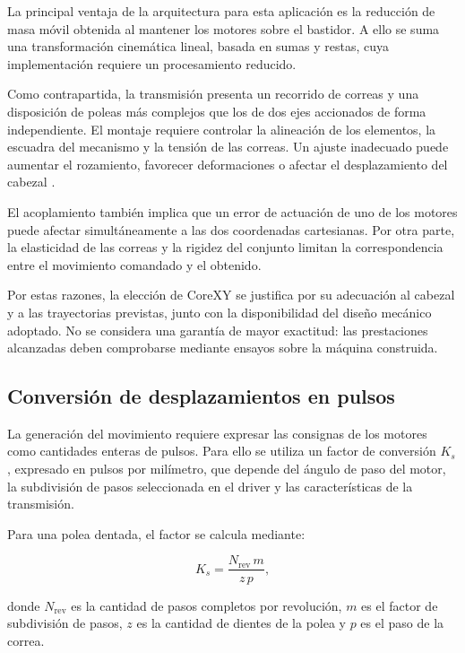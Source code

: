 \documentclass[blue,fullpaper]{ludusofficial}  %
\begin{document}
La principal ventaja de la arquitectura
para esta aplicación es la reducción
de masa móvil obtenida al mantener
los motores sobre el bastidor.
A ello se suma una transformación
cinemática lineal, basada en sumas
y restas, cuya implementación requiere
un procesamiento reducido.

Como contrapartida, la transmisión
presenta un recorrido de correas
y una disposición de poleas más
complejos que los de dos ejes
accionados de forma independiente.
El montaje requiere controlar
la alineación de los elementos,
la escuadra del mecanismo y
la tensión de las correas.
Un ajuste inadecuado puede aumentar
el rozamiento, favorecer deformaciones
o afectar el desplazamiento del cabezal
\cite{corexy_ajuste}.

El acoplamiento también implica que
un error de actuación de uno de los
motores puede afectar simultáneamente
a las dos coordenadas cartesianas.
Por otra parte, la elasticidad de
las correas y la rigidez del conjunto
limitan la correspondencia entre
el movimiento comandado y el obtenido.

Por estas razones, la elección de CoreXY
se justifica por su adecuación al
cabezal y a las trayectorias previstas,
junto con la disponibilidad del diseño
mecánico adoptado. No se considera
una garantía de mayor exactitud:
las prestaciones alcanzadas deben
comprobarse mediante ensayos sobre
la máquina construida.

\subsection{Conversión de desplazamientos en pulsos}

La generación del movimiento requiere expresar
las consignas de los motores como cantidades
enteras de pulsos. Para ello se utiliza un factor
de conversión $K_s$, expresado en pulsos por milímetro,
que depende del ángulo de paso del motor,
la subdivisión de pasos seleccionada en el driver
y las características de la transmisión.

Para una polea dentada, el factor se calcula mediante:

\begin{equation}
    K_s =
    \frac{N_{\mathrm{rev}}\,m}{z\,p},
    \label{eq:pulsos-por-milimetro}
\end{equation}

donde $N_{\mathrm{rev}}$ es la cantidad de pasos
completos por revolución, $m$ es el factor de
subdivisión de pasos, $z$ es la cantidad de dientes
de la polea y $p$ es el paso de la correa.
\end{document}
